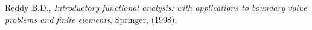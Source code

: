 \documentclass{marine_2015}
\begin{document}
\newpage
\begin{thebibliography}{99}

 Reddy B.D., \textit{Introductory functional analysis: with applications
  to boundary value problems and finite elements}, Springer, (1998).

%
%
%
%
%

\end{thebibliography}
\end{document}
